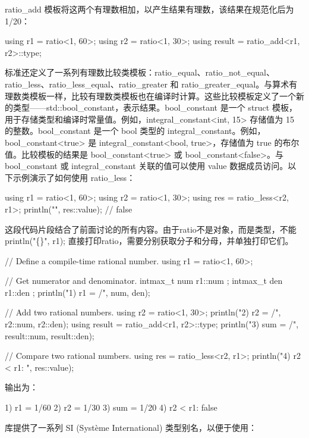 ratio\_add 模板将这两个有理数相加，以产生结果有理数，该结果在规范化后为 1/20：

\begin{cpp}
using r1 = ratio<1, 60>;
using r2 = ratio<1, 30>;
using result = ratio_add<r1, r2>::type;
\end{cpp}

标准还定义了一系列有理数比较类模板：ratio\_equal、ratio\_not\_equal、ratio\_less、ratio\_less\_equal、ratio\_greater 和 ratio\_greater\_equal。与算术有理数类模板一样，比较有理数类模板也在编译时计算。这些比较模板定义了一个新的类型——std::bool\_constant，表示结果。bool\_constant 是一个 struct 模板，用于存储类型和编译时常量值。例如，integral\_constant<int, 15> 存储值为 15 的整数。bool\_constant 是一个 bool 类型的 integral\_constant。例如，bool\_constant<true> 是 integral\_constant<bool, true>，存储值为 true 的布尔值。比较模板的结果是 bool\_constant<true> 或 bool\_constant<false>。与 bool\_constant 或 integral\_constant 关联的值可以使用 value 数据成员访问。以下示例演示了如何使用 ratio\_less：

\begin{cpp}
using r1 = ratio<1, 60>;
using r2 = ratio<1, 30>;
using res = ratio_less<r2, r1>;
println("{}", res::value); // false
\end{cpp}

这段代码片段结合了前面讨论的所有内容。由于ratio不是对象，而是类型，不能println("\{\}", r1); 直接打印ratio，需要分别获取分子和分母，并单独打印它们。

\begin{cpp}
// Define a compile-time rational number.
using r1 = ratio<1, 60>;

// Get numerator and denominator.
intmax_t num { r1::num };
intmax_t den { r1::den };
println("1) r1 = {}/{}", num, den);

// Add two rational numbers.
using r2 = ratio<1, 30>;
println("2) r2 = {}/{}", r2::num, r2::den);
using result = ratio_add<r1, r2>::type;
println("3) sum = {}/{}", result::num, result::den);

// Compare two rational numbers.
using res = ratio_less<r2, r1>;
println("4) r2 < r1: {}", res::value);
\end{cpp}

输出为：

\begin{shell}
1) r1 = 1/60
2) r2 = 1/30
3) sum = 1/20
4) r2 < r1: false
\end{shell}

库提供了一系列 SI (Système International) 类型别名，以便于使用：

